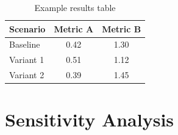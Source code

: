 \documentclass[12pt, letterpaper]{article}
\begin{document}

\begin{table}[H]
    \centering
    \caption{Example results table}
    \begin{tabular}{lcc}
        \toprule
        \textbf{Scenario} & \textbf{Metric A} & \textbf{Metric B} \\
        \midrule
        Baseline    & 0.42 & 1.30 \\
        Variant 1   & 0.51 & 1.12 \\
        Variant 2   & 0.39 & 1.45 \\
        \bottomrule
    \end{tabular}
    \label{tab:results}
\end{table}

\section{Sensitivity Analysis}

\end{document}

